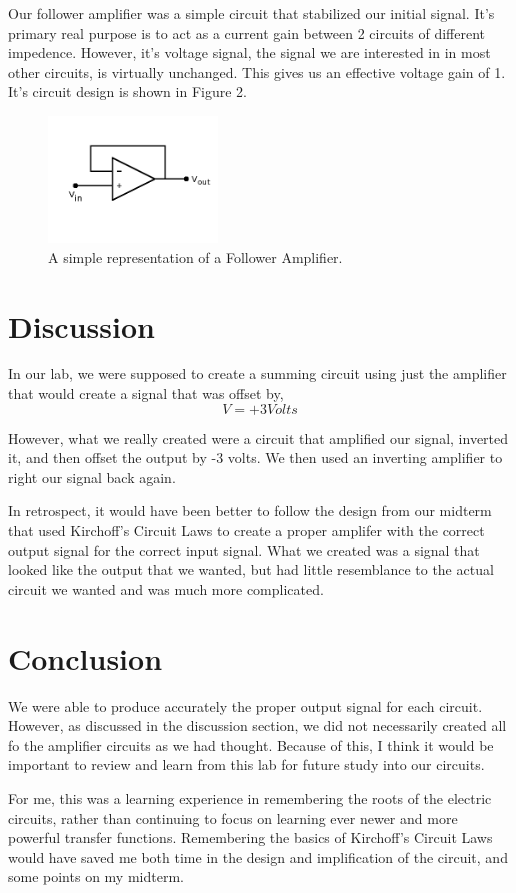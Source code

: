 \documentclass[a4paper]{article}
\begin{document}
Our follower amplifier was a simple circuit that stabilized our initial signal.  It's primary real purpose is to act as a current gain between 2 circuits of different impedence.  However, it's voltage signal, the signal we are interested in in most other circuits, is virtually unchanged.  This gives us an effective voltage gain of 1.  It's circuit design is shown in Figure 2.

\begin{figure}
\centering
\includegraphics[width=0.4\textwidth]{Follow.png}
\caption{\label{fig:follower}A simple representation of a Follower Amplifier.}
\end{figure}

\section{Discussion}

In our lab, we were supposed to create a summing circuit using just the amplifier that would create a signal that was offset by, \[V=+3 Volts\]

However, what we really created were a circuit that amplified our signal, inverted it, and then offset the output by -3 volts.  We then used an inverting amplifier to right our signal back again.

In retrospect, it would have been better to follow the design from our midterm that used Kirchoff's Circuit Laws to create a proper amplifer with the correct output signal for the correct input signal.  What we created was a signal that looked like the output that we wanted, but had little resemblance to the actual circuit we wanted and was much more complicated.

\section{Conclusion}

We were able to produce accurately the proper output signal for each circuit.  However, as discussed in the discussion section, we did not necessarily created all fo the amplifier circuits as we had thought.  Because of this, I think it would be important to review and learn from this lab for future study into our circuits.  

For me, this was a learning experience in remembering the roots of the electric circuits, rather than continuing to focus on learning ever newer and more powerful transfer functions.  Remembering the basics of Kirchoff's Circuit Laws would have saved me both time in the design and implification of the circuit, and some points on my midterm.
\end{document}
